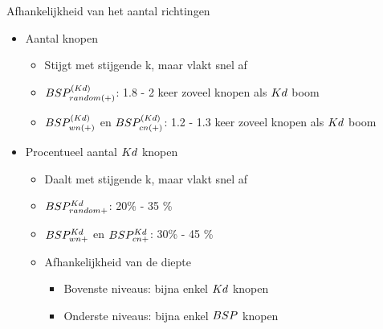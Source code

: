 \documentclass[11pt,t]{beamer}
\begin{document}
\begin{frame}{Afhankelijkheid van het aantal richtingen}
	\begin{itemize}
		\item Aantal knopen
		\begin{itemize}
			\item Stijgt met stijgende k, maar vlakt snel af
			\item $BSP^{(Kd)}_{random(+)}$: 1.8 - 2 keer zoveel knopen als $Kd$ boom
			\item $BSP^{(Kd)}_{wn(+)}$ en $BSP^{(Kd)}_{cn(+)}$: 1.2 - 1.3 keer zoveel knopen als $Kd$ boom
		\end{itemize}
		\vspace{10pt}
		\item Procentueel aantal $Kd$ knopen
		\begin{itemize}
			\item Daalt met stijgende k, maar vlakt snel af
			\item $BSP^{Kd}_{random+}$: 20\% - 35 \%
			\item $BSP^{Kd}_{wn+}$ en $BSP^{Kd}_{cn+}$: 30\% - 45 \%
			\item Afhankelijkheid van de diepte
				\begin{itemize}
					\item Bovenste niveaus: bijna enkel $Kd$ knopen
					\item Onderste niveaus: bijna enkel $BSP$ knopen
				\end{itemize}
		\end{itemize}
	\end{itemize}
\end{frame}
\end{document}
